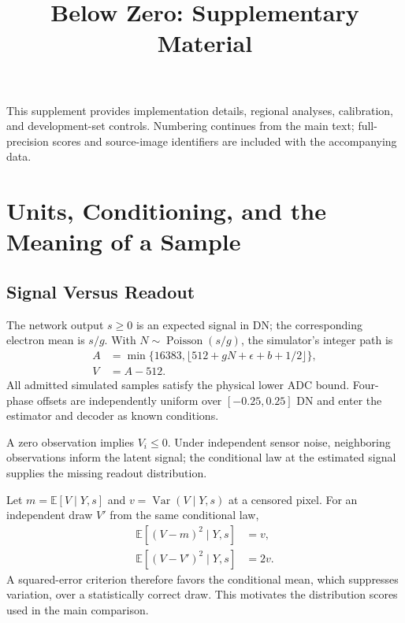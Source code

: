 \documentclass[10pt,twocolumn,journal]{IEEEtran}
\begin{document}
\title{Below Zero: Supplementary Material}
\author{\BZAuthorBlockEN}
\maketitle
\thispagestyle{fancy}

This supplement provides implementation details, regional analyses, calibration, and development-set controls. Numbering continues from the main text; full-precision scores and source-image identifiers are included with the accompanying data.

\section{Units, Conditioning, and the Meaning of a Sample}
\subsection{Signal Versus Readout}
The network output $s\geq0$ is an expected signal in DN; the corresponding electron mean is $s/g$. With $N\sim\operatorname{Poisson}(s/g)$, the simulator's integer path is
\begin{equation}
\begin{aligned}
A&=\min\{16383,\lfloor512+gN+\epsilon+b+1/2\rfloor\},\\
V&=A-512.
\end{aligned}
\end{equation}
All admitted simulated samples satisfy the physical lower ADC bound. Four-phase offsets are independently uniform over $[-0.25,0.25]$ DN and enter the estimator and decoder as known conditions.

A zero observation implies $V_i\leq0$. Under independent sensor noise, neighboring observations inform the latent signal; the conditional law at the estimated signal supplies the missing readout distribution.

Let $m=\mathbb E[V\mid Y,s]$ and $v=\operatorname{Var}(V\mid Y,s)$ at a censored pixel. For an independent draw $V'$ from the same conditional law,
\begin{align}
\mathbb E[(V-m)^2\mid Y,s]&=v,\\
\mathbb E[(V-V')^2\mid Y,s]&=2v.
\end{align}
A squared-error criterion therefore favors the conditional mean, which suppresses variation, over a statistically correct draw. This motivates the distribution scores used in the main comparison.
\end{document}
